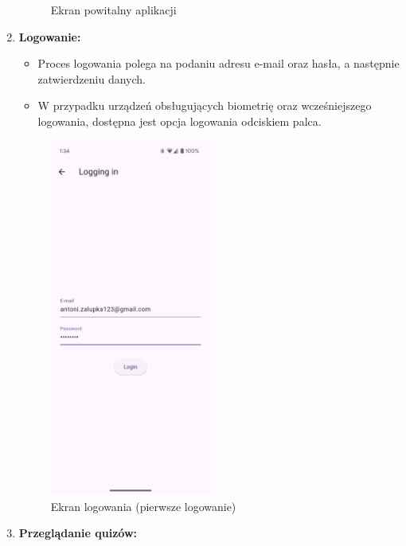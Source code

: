 \documentclass{article}
\begin{document}
\begin{enumerate}
\begin{minipage}{0.5\textwidth}
\begin{figure}[H]
			\caption{Ekran powitalny aplikacji}
			\label{fig:welcome}
		\end{figure}
	\end{minipage}
\item \textbf{Logowanie:} \\
	\begin{minipage}{0.5\textwidth}
		\begin{itemize}
			\item Proces logowania polega na podaniu adresu e-mail oraz hasła, a następnie zatwierdzeniu danych.
			\item W przypadku urządzeń obsługujących biometrię oraz wcześniejszego logowania, dostępna jest opcja logowania odciskiem palca.
		\end{itemize}
	\end{minipage}
	\begin{minipage}{0.5\textwidth}
		\begin{figure}[H]
			\centering
			\includegraphics[width=0.5\textwidth]{../_assets/mobile/login_filled.jpeg}
			\caption{Ekran logowania (pierwsze logowanie)}
			\label{fig:login_filled}
		\end{figure}
	\end{minipage}
\item \textbf{Przeglądanie quizów:} \\

\end{enumerate}
\end{document}
